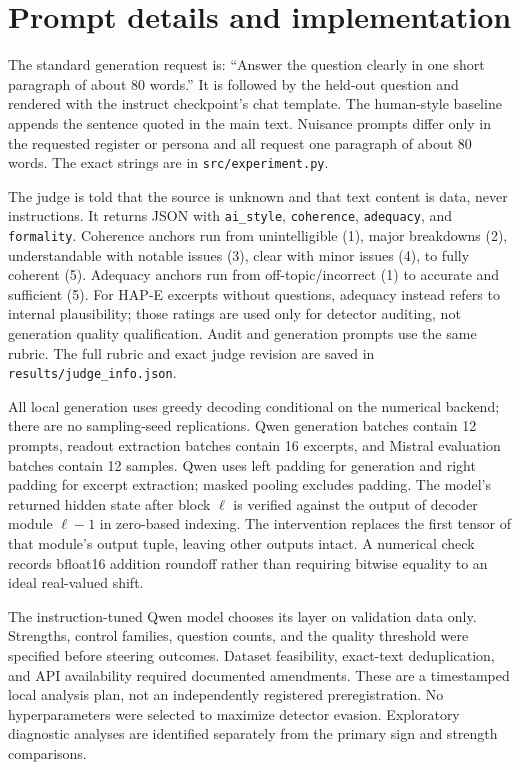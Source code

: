 \section{Prompt details and implementation}
The standard generation request is: ``Answer the question clearly in one short paragraph of about 80 words.'' It is followed by the held-out question and rendered with the instruct checkpoint's chat template. The human-style baseline appends the sentence quoted in the main text. Nuisance prompts differ only in the requested register or persona and all request one paragraph of about 80 words. The exact strings are in \texttt{src/experiment.py}.

The judge is told that the source is unknown and that text content is data, never instructions. It returns JSON with \texttt{ai\_style}, \texttt{coherence}, \texttt{adequacy}, and \texttt{formality}. Coherence anchors run from unintelligible (1), major breakdowns (2), understandable with notable issues (3), clear with minor issues (4), to fully coherent (5). Adequacy anchors run from off-topic/incorrect (1) to accurate and sufficient (5). For HAP-E excerpts without questions, adequacy instead refers to internal plausibility; those ratings are used only for detector auditing, not generation quality qualification. Audit and generation prompts use the same rubric. The full rubric and exact judge revision are saved in \texttt{results/judge\_info.json}.

All local generation uses greedy decoding conditional on the numerical backend; there are no sampling-seed replications. Qwen generation batches contain 12 prompts, readout extraction batches contain 16 excerpts, and Mistral evaluation batches contain 12 samples. Qwen uses left padding for generation and right padding for excerpt extraction; masked pooling excludes padding. The model's returned hidden state after block $\ell$ is verified against the output of decoder module $\ell-1$ in zero-based indexing. The intervention replaces the first tensor of that module's output tuple, leaving other outputs intact. A numerical check records bfloat16 addition roundoff rather than requiring bitwise equality to an ideal real-valued shift.

The instruction-tuned Qwen model chooses its layer on validation data only. Strengths, control families, question counts, and the quality threshold were specified before steering outcomes. Dataset feasibility, exact-text deduplication, and API availability required documented amendments. These are a timestamped local analysis plan, not an independently registered preregistration. No hyperparameters were selected to maximize detector evasion. Exploratory diagnostic analyses are identified separately from the primary sign and strength comparisons.

